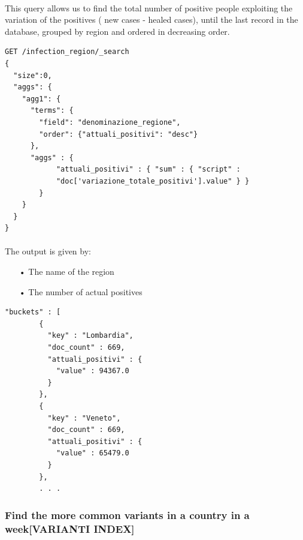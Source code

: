 \documentclass[a4paper,12pt]{article}
\begin{document}
\paragraph{} This query allows us to find the total number of positive people exploiting the variation of the positives ( new cases - healed cases), until the last record in the database, grouped by region and ordered in decreasing order.
\begin{tcolorbox}[colback=green!5!white,colframe=green!75!black,title=QUERY]
\begin{verbatim}
GET /infection_region/_search
{ 
  "size":0,
  "aggs": {
    "agg1": {
      "terms": {
        "field": "denominazione_regione",
        "order": {"attuali_positivi": "desc"}
      },
      "aggs" : {
            "attuali_positivi" : { "sum" : { "script" : 
            "doc['variazione_totale_positivi'].value" } }
        }
    }
  }
}
\end{verbatim}
\end{tcolorbox}

\paragraph{} The output is given by: 
\begin{itemize}[noitemsep]
\item[•] The name of the region
\item[•] The number of actual positives
\end{itemize}

\begin{tcolorbox}[colback=red!5!white,colframe=red!75!black,title=OUTPUT]
\begin{verbatim}
"buckets" : [
        {
          "key" : "Lombardia",
          "doc_count" : 669,
          "attuali_positivi" : {
            "value" : 94367.0
          }
        },
        {
          "key" : "Veneto",
          "doc_count" : 669,
          "attuali_positivi" : {
            "value" : 65479.0
          }
        },
        . . .
\end{verbatim}
\end{tcolorbox}

\subsubsection{Find the more common variants in a country in a week[VARIANTI INDEX]  }
\end{document}
